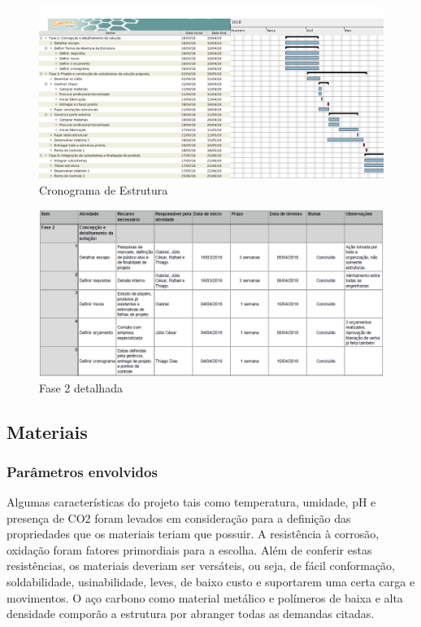 \begin{figure}[H]
	\centering
	\includegraphics[width=17cm]{figuras/cronograma_estrutura.png}
	\caption{Cronograma de Estrutura} \label{cronograma_estrutura}
\end{figure}

\begin{figure}[H]
	\centering
	\includegraphics[width=17cm]{figuras/fase_2.png}
	\caption{Fase 2 detalhada} 
	\label{fase_2}
\end{figure}

\subsection{Materiais}

\subsubsection{Parâmetros envolvidos}

Algumas características do projeto tais como temperatura, umidade, pH e presença de CO2 foram levados em consideração para a definição das propriedades que os materiais teriam que possuir. A resistência à corrosão, oxidação foram fatores primordiais para a escolha. Além de conferir estas resistências, os materiais deveriam ser versáteis, ou seja, de fácil conformação, soldabilidade, usinabilidade, leves, de baixo custo e suportarem uma certa carga e movimentos. O aço carbono como material metálico e polímeros de baixa e alta densidade comporão a estrutura por abranger todas as demandas citadas.

